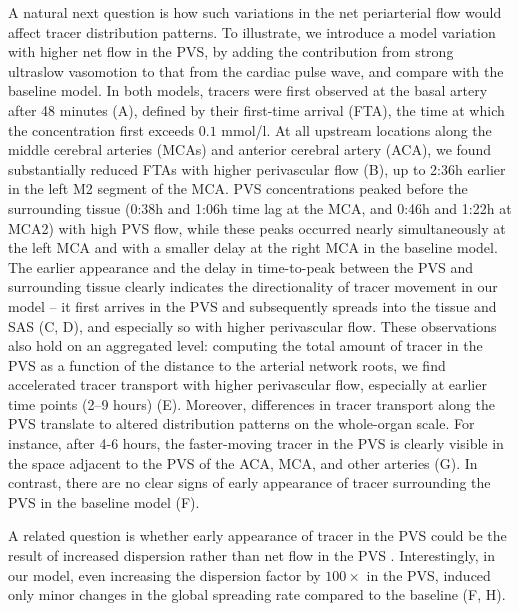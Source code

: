 \documentclass[fleqn,10pt]{wlscirep}
\begin{document}
A natural next question is how such variations in the net
periarterial flow would affect tracer distribution patterns. To
illustrate, we introduce a model variation with higher net flow in the
PVS, by adding the contribution from strong ultraslow vasomotion to
that from the cardiac pulse wave, and compare with the baseline model.
%
In both models, tracers were first observed at the basal artery after
48 minutes (A), defined by their first-time
arrival (FTA), the time at which the concentration first exceeds $0.1$
mmol/l. At all upstream locations along the middle cerebral arteries
(MCAs) and anterior cerebral artery (ACA), we found substantially
reduced FTAs with higher perivascular flow (B), up to
2:36h earlier in the left M2 segment of the MCA. PVS
concentrations peaked before the surrounding tissue (0:38h and 1:06h time lag at
the MCA, and 0:46h and 1:22h at MCA2) with high PVS flow, while these
peaks occurred nearly simultaneously at the left MCA and with a smaller delay at the right MCA in the baseline model. The
earlier appearance and the delay in time-to-peak between the PVS and
surrounding tissue clearly indicates the directionality of tracer
movement in our model -- it first arrives in the PVS and subsequently
spreads into the tissue and SAS (C, D), and
especially so with higher perivascular flow. These observations also hold on an
aggregated level: computing the total amount of tracer in the PVS as a
function of the distance to the arterial network roots, we find
accelerated tracer transport with higher perivascular flow, especially at
earlier time points (2--9 hours) (E). Moreover,
differences in tracer transport along the PVS translate to altered
distribution patterns on the whole-organ scale. For instance, after
4-6 hours, the faster-moving tracer in the PVS is clearly visible in
the space adjacent to the PVS of the ACA, MCA, and other arteries
(G). In contrast, there are no clear signs of
early appearance of tracer surrounding the PVS in the baseline model
(F).

A related question is whether early appearance of tracer in the PVS
could be the result of increased dispersion rather than net flow in
the PVS
\cite{asgari2016glymphatic,sharp2019dispersion,bojarskaite2023sleep,asgari2016glymphatic,troyetsky2021dispersion}. Interestingly,
in our model, even increasing the dispersion factor by $100 \times$ in
the PVS, induced only minor changes in the global spreading rate
compared to the baseline (F, H).
\end{document}
